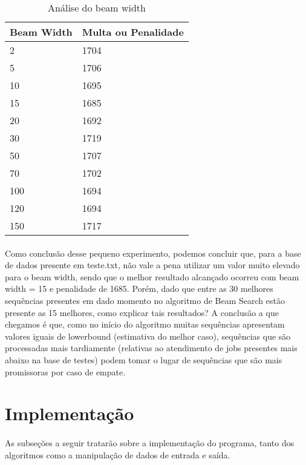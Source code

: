 \documentclass[12pt,a4paper]{article}
\begin{document}
  \begin{table}[!h]
\centering
\caption{Análise do beam width}
\label{my-label}
\begin{tabular}{|l|l|}
\hline
Beam Width    & Multa ou Penalidade \\ \hline
2             & 1704                \\ \hline
5             & 1706                \\ \hline
10            & 1695                \\ \hline
15            & 1685                \\ \hline
20            & 1692                \\ \hline
30            & 1719                \\ \hline
50            & 1707                \\ \hline
70            & 1702                \\ \hline
100           & 1694                \\ \hline
120           & 1694                \\ \hline
150           & 1717                \\ \hline
\end{tabular}
\end{table}

{\paragraph{} Como conclusão desse pequeno experimento, podemos concluir que, para a base de dados presente em teste.txt, não
vale a pena utilizar um valor muito elevado para o beam width, sendo que o melhor resultado alcançado ocorreu com beam width
= 15 e penalidade de 1685. Porém, dado que entre as 30 melhores sequências presentes em dado momento no algoritmo de Beam Search
estão presente as 15 melhores, como explicar tais resultados? A conclusão a que chegamos é que, como no início do algoritmo muitas
sequências apresentam valores iguais de lowerbound (estimativa do melhor caso), sequências que são processadas mais tardiamente
(relativas ao atendimento de jobs presentes mais abaixo na base de testes) podem tomar o lugar de sequências que são mais promissoras
por caso de empate.}
  
 \newpage
 
 \section{Implementação}  
  {\paragraph{} As subseções a seguir tratarão sobre a implementação do programa, tanto dos algoritmos como a manipulação de dados de entrada e saída. }
  
\end{document}
